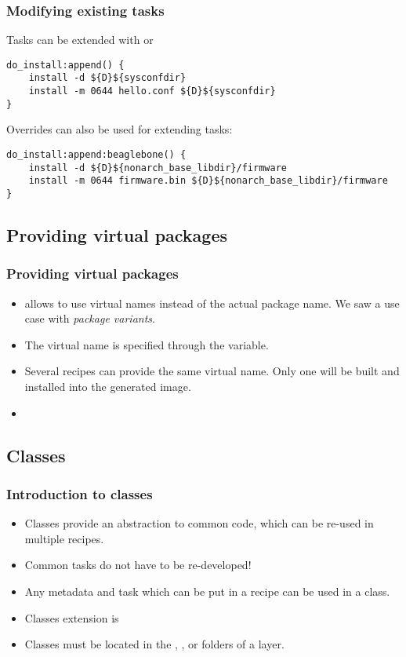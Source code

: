 \begin{frame}[fragile]
  \frametitle{Modifying existing tasks}
  Tasks can be extended with  or 
  \begin{block}{}
    \begin{verbatim}
do_install:append() {
    install -d ${D}${sysconfdir}
    install -m 0644 hello.conf ${D}${sysconfdir}
}
    \end{verbatim}
  \end{block}
  Overrides can also be used for extending tasks:
  \begin{block}{}
    \begin{verbatim}
do_install:append:beaglebone() {
    install -d ${D}${nonarch_base_libdir}/firmware
    install -m 0644 firmware.bin ${D}${nonarch_base_libdir}/firmware
}
    \end{verbatim}
  \end{block}
\end{frame}

\subsection{Providing virtual packages}

\begin{frame}
  \frametitle{Providing virtual packages}
  \begin{itemize}
    \item {} allows to use virtual names instead of the actual
          package name. We saw a use case with \emph{package
          variants}.
    \item The virtual name is specified through the 
          variable.
    \item Several recipes can provide the same virtual name. Only one
          will be built and installed into the generated image.
    \item {}
  \end{itemize}
\end{frame}

\subsection{Classes}

\begin{frame}
  \frametitle{Introduction to classes}
  \begin{itemize}
    \item Classes provide an abstraction to common code, which can be
          re-used in multiple recipes.
    \item Common tasks do not have to be re-developed!
    \item Any metadata and task which can be put in a recipe can be
          used in a class.
    \item Classes extension is 
    \item Classes must be located in the ,
      , or  folders of a layer.
  \end{itemize}
\end{frame}

